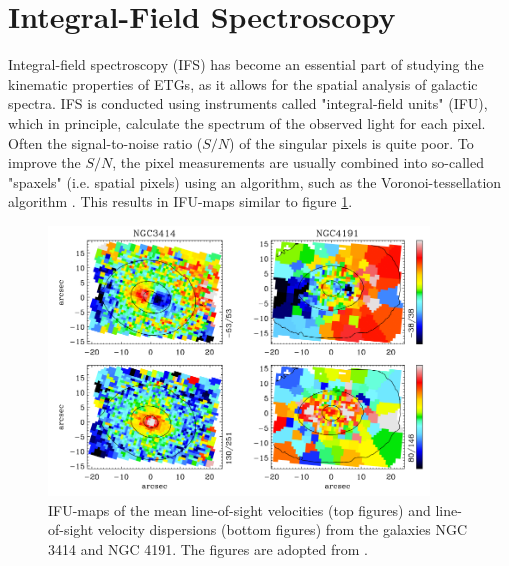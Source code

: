 \documentclass[english, twoside]{HYgradu}
\begin{document}
\section{Integral-Field Spectroscopy} \label{section:IFU}

Integral-field spectroscopy (IFS) has become an essential part of studying the kinematic properties of ETGs, as it allows for the spatial analysis of galactic spectra. IFS is conducted using instruments called "integral-field units" (IFU), which in principle, calculate the spectrum of the observed light for each pixel. Often the signal-to-noise ratio ($S/N$) of the singular pixels is quite poor. To improve the $S/N$, the pixel measurements are usually combined into so-called "spaxels" (i.e. spatial pixels) using an algorithm, such as the Voronoi-tessellation algorithm \citep{Cappellari2003}. This results in IFU-maps similar to figure \ref{figure:krajnovic_ifus}.

\begin{figure}
	\centering
	\includegraphics[width=0.9\textwidth]{krajnovic_ifus.png}
	\caption{IFU-maps of the mean line-of-sight velocities (top figures) and line-of-sight velocity dispersions (bottom figures) from the galaxies NGC 3414 and NGC 4191. The figures are adopted from \cite{Krajnovic2011}.}
	\label{figure:krajnovic_ifus}
\end{figure}
\end{document}
